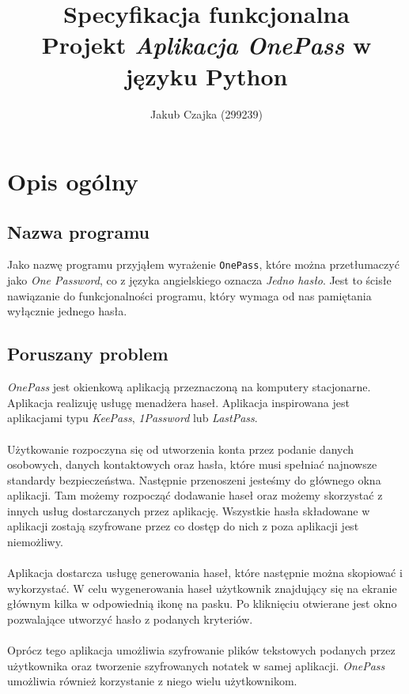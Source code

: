 \documentclass[a4paper]{article}
\title{Specyfikacja funkcjonalna\\Projekt \textit{Aplikacja OnePass} w języku Python}
\author{Jakub Czajka (299239)\\}
\newcommand{\prog}{\texttt}
\begin{document}
\maketitle
\tableofcontents
\thispagestyle{empty}

\section{Opis ogólny}

\subsection{Nazwa programu}
Jako nazwę programu przyjąłem wyrażenie \prog{OnePass}, które można przetłumaczyć jako \textit{One Password}, co z języka angielskiego oznacza \textit{Jedno hasło}. Jest to ścisłe nawiązanie do funkcjonalności programu, który wymaga od nas pamiętania wyłącznie jednego hasła.

\subsection{Poruszany problem}
\textit{OnePass} jest okienkową aplikacją przeznaczoną na komputery stacjonarne. Aplikacja realizuję usługę menadżera haseł. Aplikacja inspirowana jest aplikacjami typu \textit{KeePass}, \textit{1Password} lub \textit{LastPass}.\\ \\
Użytkowanie rozpoczyna się od utworzenia konta przez podanie danych osobowych, danych kontaktowych oraz hasła, które musi spełniać najnowsze standardy bezpieczeństwa. Następnie przenoszeni jesteśmy do głównego okna aplikacji. Tam możemy rozpocząć dodawanie haseł oraz możemy skorzystać z innych usług dostarczanych przez aplikację. Wszystkie hasła składowane w aplikacji zostają szyfrowane przez co dostęp do nich z poza aplikacji jest niemożliwy. \\ \\
Aplikacja dostarcza usługę generowania haseł, które następnie można skopiować i wykorzystać. W celu wygenerowania haseł użytkownik znajdujący się na ekranie głównym kilka w odpowiednią ikonę na pasku. Po kliknięciu otwierane jest okno pozwalające utworzyć hasło z podanych kryteriów. \\ \\
Oprócz tego aplikacja umożliwia szyfrowanie plików tekstowych podanych przez użytkownika oraz tworzenie szyfrowanych notatek w samej aplikacji. \textit{OnePass} umożliwia również korzystanie z niego wielu użytkownikom. 
\end{document}
